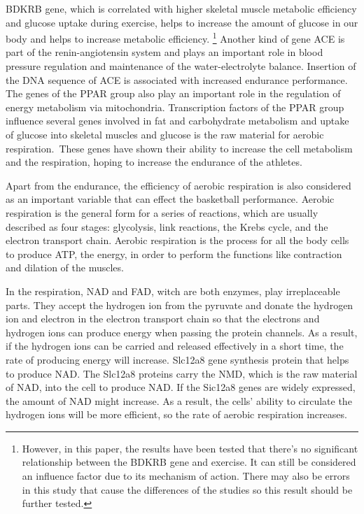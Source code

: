 \documentclass{article}
\begin{document}
BDKRB gene, which is correlated with higher skeletal muscle metabolic efficiency and glucose uptake during exercise, helps to increase the amount of glucose in our body and helps to increase metabolic efficiency.\autocite{mareksawczukPolymorphismBradykininReceptor2013} \footnote{However, in this paper, the results have been tested that there's no significant relationship between the BDKRB gene and exercise. It can still be considered an influence factor due to its mechanism of action. There may also be errors in this study that cause the differences of the studies so this result should be further tested.} Another kind of gene ACE is part of the renin-angiotensin system and plays an important role in blood pressure regulation and maintenance of the water-electrolyte balance.\autocite{loefflerBiochemieUndPathobiochemie2019} Insertion of the DNA sequence of ACE is associated with increased endurance performance. The genes of the PPAR group also play an important role in the regulation of energy metabolism via mitochondria. Transcription factors of the PPAR group influence several genes involved in fat and carbohydrate metabolism and uptake of glucose into skeletal muscles \autocite{loefflerBiochemieUndPathobiochemie2019} and glucose is the raw material for aerobic respiration. These genes have shown their ability to increase the cell metabolism and the respiration, hoping to increase the endurance of the athletes.

Apart from the endurance, the efficiency of aerobic respiration is also considered as an important variable that can effect the basketball performance. Aerobic respiration is the general form for a series of reactions, which are usually described as four stages: glycolysis, link reactions, the Krebs cycle, and the electron transport chain. Aerobic respiration is the process for all the body cells to produce ATP, the energy, in order to perform the functions like contraction and dilation of the muscles. 

In the respiration, NAD and FAD, witch are both enzymes, play irreplaceable parts. They accept the hydrogen ion from the pyruvate and donate the hydrogen ion and electron in the electron transport chain so that the electrons and hydrogen ions can produce energy when passing the protein channels. As a result, if the hydrogen ions can be carried and released effectively in a short time, the rate of producing energy will increase. Slc12a8 gene synthesis protein that helps to produce NAD. The Slc12a8 proteins carry the NMD, which is the raw material of NAD, into the cell to produce NAD. \autocite{grozioSlc12a8NicotinamideMononucleotide2019} If the Sic12a8 genes are widely expressed, the amount of NAD might increase. As a result, the cells' ability to circulate the hydrogen ions will be more efficient, so the rate of aerobic respiration increases.
\end{document}
